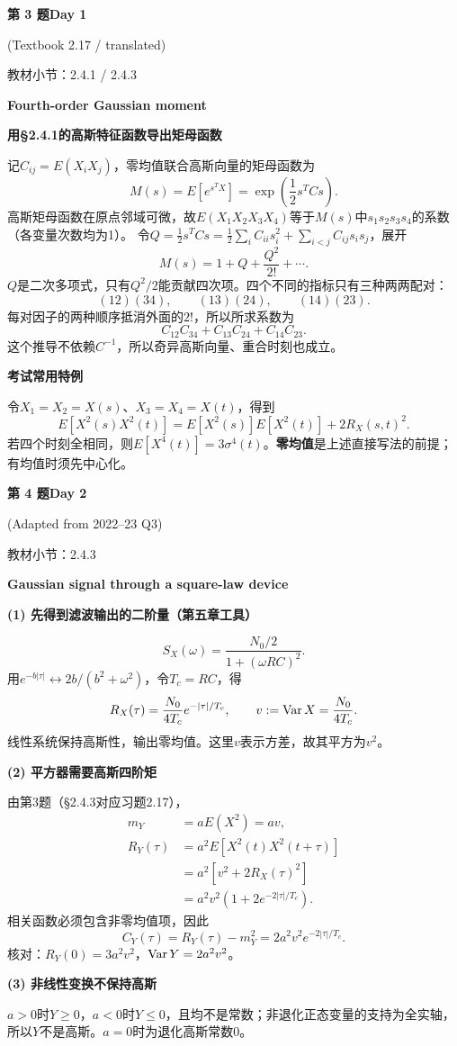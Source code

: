 \documentclass[10.5pt,fontset=fandol]{ctexart}
\newcommand{\key}[1]{\par\vspace{4pt}\noindent\textbf{\color{navy}#1}\par\vspace{2pt}}
\newcommand{\qtitle}[2]{\par\addvspace{1.2em}\Needspace{8\baselineskip}\begin{tcolorbox}[colback=navy,colframe=navy,arc=1.5pt,boxrule=0pt]\color{white}\large\bfseries #1\hfill\small #2\end{tcolorbox}}
\begin{document}
\qtitle{第 3 题}{Day 1}
{\small\color{accentred}(Textbook 2.17 / translated)}\par\smallskip
{\small\color{muted}教材小节：2.4.1 / 2.4.3}\par\medskip
\noindent\textbf{Fourth-order Gaussian moment}\par\smallskip\begin{tcolorbox}[breakable,colback=qbg,colframe=qbg,boxrule=0pt]\key{用§2.4.1的高斯特征函数导出矩母函数}
记$C_{ij}=E(X_iX_j)$，零均值联合高斯向量的矩母函数为
\[M(s)=E[e^{s^TX}]=\exp\!\left(\frac12s^TCs\right).\]
高斯矩母函数在原点邻域可微，故$E(X_1X_2X_3X_4)$等于$M(s)$中$s_1s_2s_3s_4$的系数（各变量次数均为1）。
令$Q=\tfrac12s^TCs=\tfrac12\sum_i C_{ii}s_i^2+\sum_{i<j}C_{ij}s_is_j$，展开
\[M(s)=1+Q+\frac{Q^2}{2!}+\cdots.\]
$Q$是二次多项式，只有$Q^2/2$能贡献四次项。四个不同的指标只有三种两两配对：
\[(12)(34),\qquad(13)(24),\qquad(14)(23).\]
每对因子的两种顺序抵消外面的$2!$，所以所求系数为
\[\boxed{C_{12}C_{34}+C_{13}C_{24}+C_{14}C_{23}.}\]
这个推导不依赖$C^{-1}$，所以奇异高斯向量、重合时刻也成立。
\key{考试常用特例}
令$X_1=X_2=X(s)$、$X_3=X_4=X(t)$，得到
\[E[X^2(s)X^2(t)]=E[X^2(s)]E[X^2(t)]+2R_X(s,t)^2.\]
若四个时刻全相同，则$E[X^4(t)]=3\sigma^4(t)$。\textbf{零均值}是上述直接写法的前提；有均值时须先中心化。

\end{tcolorbox}
\qtitle{第 4 题}{Day 2}
{\small\color{accentred}(Adapted from 2022--23 Q3)}\par\smallskip
{\small\color{muted}教材小节：2.4.3}\par\medskip
\noindent\textbf{Gaussian signal through a square-law device}\par\smallskip\begin{tcolorbox}[breakable,colback=qbg,colframe=qbg,boxrule=0pt]\key{(1) 先得到滤波输出的二阶量（第五章工具）}
\[S_X(\omega)=\frac{N_0/2}{1+(\omega RC)^2}.\]
用$e^{-b|\tau|}\leftrightarrow2b/(b^2+\omega^2)$，令$T_c=RC$，得
\[R_X(\tau)=\frac{N_0}{4T_c}e^{-|\tau|/T_c},\qquad v:=\operatorname{Var} X=\frac{N_0}{4T_c}.\]
线性系统保持高斯性，输出零均值。这里$v$表示方差，故其平方为$v^2$。
\key{(2) 平方器需要高斯四阶矩}
由第3题（§2.4.3对应习题2.17），
\[\begin{aligned}m_Y&=aE(X^2)=av,\\
R_Y(\tau)&=a^2E[X^2(t)X^2(t+\tau)]\\
&=a^2[v^2+2R_X(\tau)^2]\\
&=\boxed{a^2v^2(1+2e^{-2|\tau|/T_c})}.\end{aligned}\]
相关函数必须包含非零均值项，因此
\[\boxed{C_Y(\tau)=R_Y(\tau)-m_Y^2=2a^2v^2e^{-2|\tau|/T_c}.}\]
核对：$R_Y(0)=3a^2v^2$，$\operatorname{Var} Y=2a^2v^2$。
\key{(3) 非线性变换不保持高斯}
$a>0$时$Y\ge0$，$a<0$时$Y\le0$，且均不是常数；非退化正态变量的支持为全实轴，所以$Y$不是高斯。$a=0$时为退化高斯常数0。

\end{tcolorbox}
\end{document}

